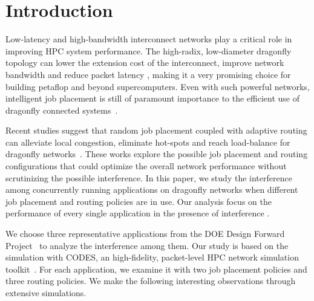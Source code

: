 \section{Introduction}
\label{sec:intro}

Low-latency and high-bandwidth interconnect networks play a critical role in improving HPC system performance. 
The high-radix, low-diameter dragonfly topology can lower the extension cost of the interconnect, improve network bandwidth and reduce packet latency \cite{dally-dragonfly}, 
making it a very promising choice for building petaflop and beyond supercomputers. 
Even with such powerful networks, 
intelligent job placement is still of paramount importance to the efficient use of dragonfly connected systems~\cite{bhatele2015, jain-sc14}. 

Recent studies suggest that random job placement coupled with adaptive routing can alleviate local congestion, eliminate hot-spots and reach load-balance for dragonfly networks~\cite{jain-sc14, bhatele-sc11, brandt2014}. 
These works explore the possible job placement and routing configurations that could optimize the overall network performance without scrutinizing the possible interference.
In this paper, we study the interference among concurrently running applications on dragonfly networks when different job placement and routing policies are in use. 
Our analysis focus on the performance of every single application in the presence of interference . 



We choose three representative applications from the DOE Design Forward Project~\cite{designforward-webpage} to analyze the interference among them. Our study is based on the simulation with CODES, an high-fidelity, packet-level HPC network simulation toolkit~\cite{codes}.
For each application, we examine it with two job placement policies and three routing policies.
We make the following interesting observations through extensive simulations.


